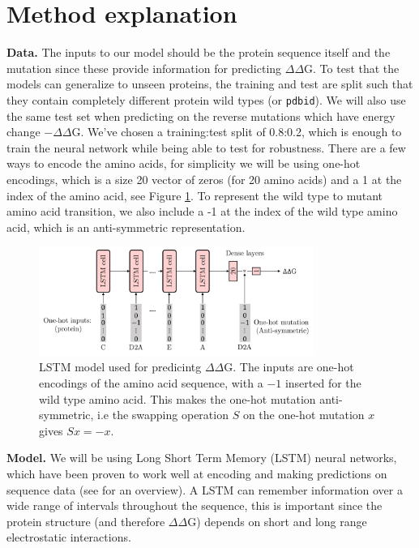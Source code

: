 \documentclass{article}
\begin{document}
\section{Method explanation}

\textbf{Data.} The inputs to our model should be the protein sequence itself and the mutation since these provide information for predicting $\Delta\Delta$G. To test that the models can generalize to unseen proteins, the training and test are split such that they contain completely different protein wild types (or \texttt{pdbid}). We will also use the same test set when predicting on the reverse mutations which have energy change $-\Delta\Delta$G. We've chosen a training:test split of 0.8:0.2, which is enough to train the neural network while being able to test for robustness. There are a few ways to encode the amino acids, for simplicity we will be using one-hot encodings, which is a size 20 vector of zeros (for 20 amino acids) and a 1 at the index of the amino acid, see Figure \ref{fig:lstm}. To represent the wild type to mutant amino acid transition, we also include a -1  at the index of the wild type amino acid, which is an anti-symmetric representation.
\clearpage

\begin{figure}[!htb]
    \centering
    \includegraphics[width=0.8\textwidth]{lstm.pdf}
    \caption{\label{fig:lstm}LSTM model used for predicintg $\Delta\Delta$G. The inputs are one-hot encodings of the amino acid sequence, with a $-1$ inserted for the wild type amino acid. This makes the one-hot mutation anti-symmetric, i.e the swapping operation $S$ on the one-hot mutation $x$ gives $Sx = -x$.}
\end{figure}
\FloatBarrier

\textbf{Model.} We will be using Long Short Term Memory (LSTM) neural networks, which have been proven to work well at encoding and making predictions on sequence data (see \cite{lstmwiki} for an overview). A LSTM can remember information over a wide range of intervals throughout the sequence, this is important since the protein structure (and therefore $\Delta\Delta$G) depends on short and long range electrostatic interactions.
\end{document}
